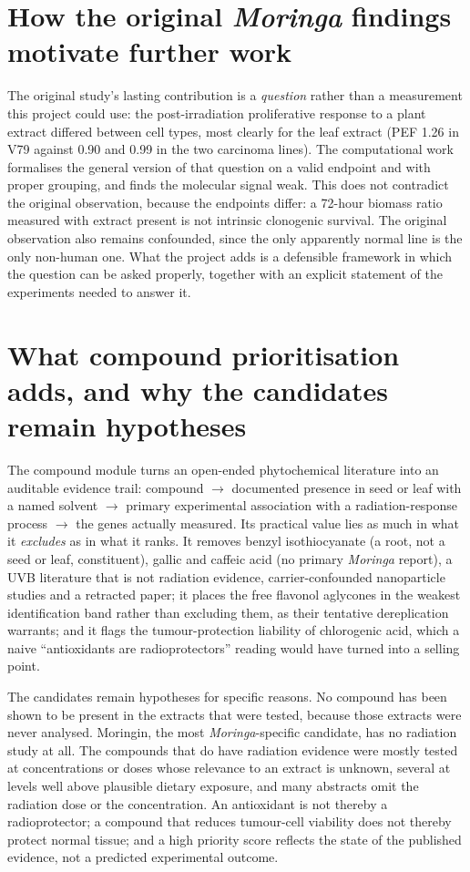 \section{How the original \textit{Moringa} findings motivate further work}

The original study's lasting contribution is a \emph{question} rather than a measurement this
project could use: the post-irradiation proliferative response to a plant extract differed
between cell types, most clearly for the leaf extract (PEF 1.26 in V79 against 0.90 and 0.99
in the two carcinoma lines). The computational work formalises the general version of that
question on a valid endpoint and with proper grouping, and finds the molecular signal weak.
This does not contradict the original observation, because the endpoints differ: a 72-hour
biomass ratio measured with extract present is not intrinsic clonogenic survival. The
original observation also remains confounded, since the only apparently normal line is the
only non-human one. What the project adds is a defensible framework in which the question can
be asked properly, together with an explicit statement of the experiments needed to answer it.

\section{What compound prioritisation adds, and why the candidates remain hypotheses}

The compound module turns an open-ended phytochemical literature into an auditable evidence
trail: compound $\rightarrow$ documented presence in seed or leaf with a named solvent
$\rightarrow$ primary experimental association with a radiation-response process
$\rightarrow$ the genes actually measured. Its practical value lies as much in what it
\emph{excludes} as in what it ranks. It removes benzyl isothiocyanate (a root, not a seed or
leaf, constituent), gallic and caffeic acid (no primary \textit{Moringa} report), a UVB
literature that is not radiation evidence, carrier-confounded nanoparticle studies and a
retracted paper; it places the free flavonol aglycones in the weakest identification band
rather than excluding them, as their tentative dereplication warrants; and it flags the
tumour-protection liability of chlorogenic acid, which a naive \enquote{antioxidants are
radioprotectors} reading would have turned into a selling point.

The candidates remain hypotheses for specific reasons. No compound has been shown to be
present in the extracts that were tested, because those extracts were never analysed.
Moringin, the most \textit{Moringa}-specific candidate, has no radiation study at all. The
compounds that do have radiation evidence were mostly tested at concentrations or doses whose
relevance to an extract is unknown, several at levels well above plausible dietary exposure,
and many abstracts omit the radiation dose or the concentration. An antioxidant is not
thereby a radioprotector; a compound that reduces tumour-cell viability does not thereby
protect normal tissue; and a high priority score reflects the state of the published
evidence, not a predicted experimental outcome.

